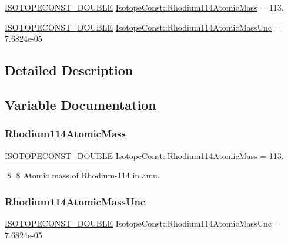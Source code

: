 \begin{DoxyCompactItemize}
\item 
\mbox{\hyperlink{group___isotope_const-_macros_ga8f45a7272ce02c0b4c65c44636ed719a}{I\+S\+O\+T\+O\+P\+E\+C\+O\+N\+S\+T\+\_\+\+D\+O\+U\+B\+LE}} \mbox{\hyperlink{group___isotope_const-_rhodium-_rh114_ga70497902b72dd6ce77a02d43661662ff}{Isotope\+Const\+::\+Rhodium114\+Atomic\+Mass}} = 113.
\item 
\mbox{\hyperlink{group___isotope_const-_macros_ga8f45a7272ce02c0b4c65c44636ed719a}{I\+S\+O\+T\+O\+P\+E\+C\+O\+N\+S\+T\+\_\+\+D\+O\+U\+B\+LE}} \mbox{\hyperlink{group___isotope_const-_rhodium-_rh114_ga13eb40486306549f49c5cfa3e0997a7f}{Isotope\+Const\+::\+Rhodium114\+Atomic\+Mass\+Unc}} = 7.\+6824e-\/05
\end{DoxyCompactItemize}


\subsection{Detailed Description}


\subsection{Variable Documentation}
\mbox{\label{group___isotope_const-_rhodium-_rh114_ga70497902b72dd6ce77a02d43661662ff}} 
\subsubsection{\texorpdfstring{Rhodium114\+Atomic\+Mass}{Rhodium114AtomicMass}}
{\footnotesize\ttfamily \mbox{\hyperlink{group___isotope_const-_macros_ga8f45a7272ce02c0b4c65c44636ed719a}{I\+S\+O\+T\+O\+P\+E\+C\+O\+N\+S\+T\+\_\+\+D\+O\+U\+B\+LE}} Isotope\+Const\+::\+Rhodium114\+Atomic\+Mass = 113.}

\$ \$ Atomic mass of Rhodium-\/114 in amu. \mbox{\label{group___isotope_const-_rhodium-_rh114_ga13eb40486306549f49c5cfa3e0997a7f}} 
\subsubsection{\texorpdfstring{Rhodium114\+Atomic\+Mass\+Unc}{Rhodium114AtomicMassUnc}}
{\footnotesize\ttfamily \mbox{\hyperlink{group___isotope_const-_macros_ga8f45a7272ce02c0b4c65c44636ed719a}{I\+S\+O\+T\+O\+P\+E\+C\+O\+N\+S\+T\+\_\+\+D\+O\+U\+B\+LE}} Isotope\+Const\+::\+Rhodium114\+Atomic\+Mass\+Unc = 7.\+6824e-\/05}

